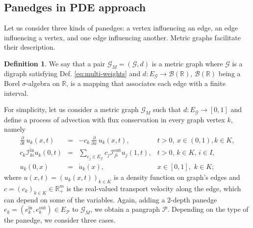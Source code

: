 \documentclass[a4paper,12pt]{article}
\theoremstyle{definition}
\newtheorem{definition}{Definition}
\theoremstyle{remark}
\newcommand{\mG}{\mathcal{G}}
\newcommand{\mP}{\mathcal{P}}
\newcommand{\tin}{\mathrm{in}}
\newcommand{\out}{\mathrm{out}}
\newcommand{\inci}{\mathcal{I}^{\tin}}
\newcommand{\inco}{\mathcal{I}^{\out}}
\newcommand{\RR}{\mathbb{R}}
\begin{document}
\subsection{Panedges in PDE approach}
Let us consider three kinds of panedges: a vertex influencing an edge, an edge influencing a vertex, and one edge influencing another. Metric graphs facilitate their description.

\begin{definition}
We say that a pair $\mG_M=(\mG,d)$ is a metric graph where $\mG$ is a digraph satisfying Def. \eqref{eq:multi-weights} and $d:E_{\mG}\to \mathcal{B}(\RR)$, $\mathcal{B}(\RR)$ being a Borel $\sigma$-algebra on $\RR$, is a mapping that associates each edge with a finite interval. 
\end{definition}

For simplicity, let us consider a metric graph $\mathcal{G}_M$ such that $d:E_{\mathcal{G}}\to [0,1]$ and define a process of advection with flux conservation in every graph vertex $k$, namely 
\begin{equation}\label{eq:F}
\begin{array}{rcll}
\frac{\partial}{\partial t}\, u_k(x,t) &=& -c_k\,\frac{\partial}{\partial x}\, u_k(x,t)
,&t >0,\ x\in(0,1), k\in K,\\[.1cm]
c_k\inci_{ki} u_{k}(0,t)&=&\sum_{e_j\in E_{\mG}}c_j\inco_{ji}u_{j}(1,t),& t >0,\,k\in K,\,  i\in I,
\\[.1cm]
u_k(0,x)&=& \mathring{u}_k(x), &x\in\left[0,1\right],\,\,k\in K;
\end{array}
\end{equation}
where $u(x,t)=(u_k(x,t))_{k\in K}$ is a density function on graph's edges and $c=(c_k)_{k\in K}\in \mathbb{R}_+^m$ is the real-valued transport velocity along the edge, which can depend on some of the variables. Again, adding a $2$-depth panedge $e_k=(e_k^{\tin},e_k^{\out})\in E_{\mP}$ to $\mathcal{G}_M$, we obtain a pangraph $\mP$. Depending on the type of the panedge, we consider three cases.
\end{document}

